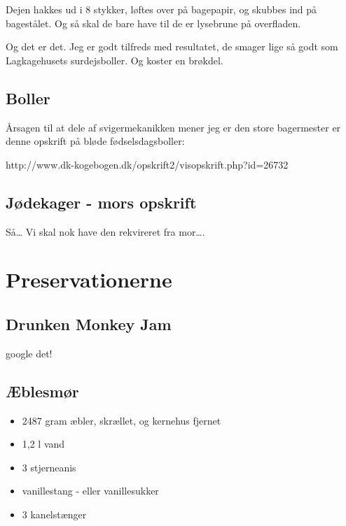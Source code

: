 \documentclass[
  letterpaper,
  DIV=11,
  numbers=noendperiod]{scrreprt}
\providecommand{\tightlist}{%
  \setlength{\itemsep}{0pt}\setlength{\parskip}{0pt}}\usepackage{longtable,booktabs,array}
\begin{document}
Dejen hakkes ud i 8 stykker, løftes over på bagepapir, og skubbes ind på
bagestålet. Og så skal de bare have til de er lysebrune på overfladen.

Og det er det. Jeg er godt tilfreds med resultatet, de smager lige så
godt som Lagkagehusets surdejsboller. Og koster en brøkdel.

\hypertarget{boller}{%
\section{Boller}\label{boller}}

Årsagen til at dele af svigermekanikken mener jeg er den store
bagermester er denne opskrift på bløde fødselsdagsboller:

http://www.dk-kogebogen.dk/opskrift2/visopskrift.php?id=26732

\hypertarget{juxf8dekager---mors-opskrift}{%
\section{Jødekager - mors opskrift}\label{juxf8dekager---mors-opskrift}}

Så\ldots{} Vi skal nok have den rekvireret fra mor\ldots.


\hypertarget{preservationerne}{%
\chapter{Preservationerne}\label{preservationerne}}

\hypertarget{drunken-monkey-jam}{%
\section{Drunken Monkey Jam}\label{drunken-monkey-jam}}

google det!

\hypertarget{uxe6blesmuxf8r}{%
\section{Æblesmør}\label{uxe6blesmuxf8r}}

\begin{itemize}
\tightlist
\item
  2487 gram æbler, skrællet, og kernehus fjernet
\item
  1,2 l vand
\item
  3 stjerneanis
\item
  vanillestang - eller vanillesukker
\item
  3 kanelstænger
\end{itemize}
\end{document}

